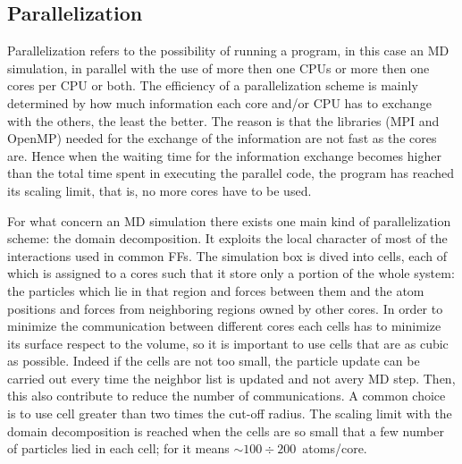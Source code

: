 \subsection{Parallelization}
Parallelization refers to the possibility of running a program, in this case an \ac{MD} simulation, in parallel with the use of more then one CPUs or more then one cores per CPU or both. The efficiency of a parallelization scheme is mainly determined by how much information each core and/or CPU has to exchange with the others, the least the better. The reason is that the libraries (MPI and OpenMP) needed for the exchange of the information are not fast as the cores are. Hence when the waiting time for the information exchange becomes higher than the total time spent in executing the parallel code, the program has reached its scaling limit, that is, no more cores have to be used.

For what concern an \ac{MD} simulation there exists one main kind of parallelization scheme: the domain decomposition. It exploits the local character of most of the interactions used in common \acp{FF}. The simulation box is dived into cells, each of which is assigned to a cores such that it store only a portion of the whole system: the particles which lie in that region and forces between them and the atom positions and forces from neighboring regions owned by other cores. In order to minimize the communication between different cores each cells has to minimize its surface respect to the volume, so it is important to use cells that are as cubic as possible. Indeed if the cells are not too small, the particle update can be carried out every time the neighbor list is updated and not avery \ac{MD} step. Then, this also contribute to reduce the number of communications. A common choice is to use cell greater than two times the cut-off radius. The scaling limit with the domain decomposition is reached when the cells are so small that a few number of particles lied in each cell; for \gromacs it means $\sim 100 \div 200$~atoms/core.

